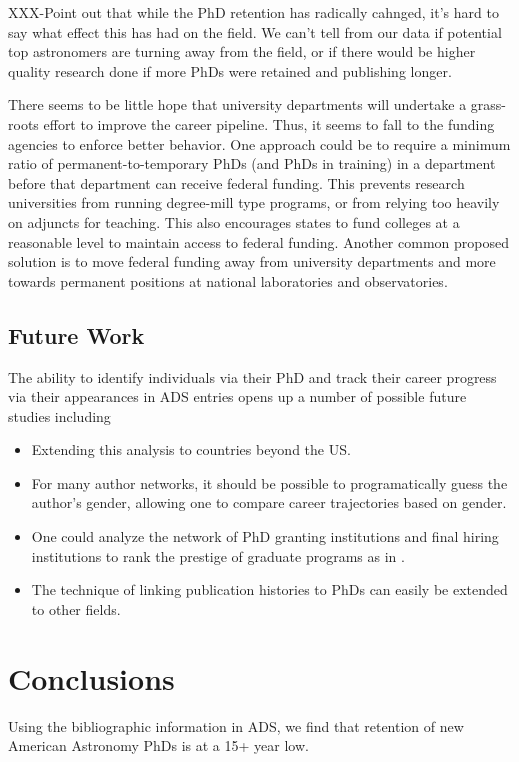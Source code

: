 \documentclass[preprint2]{aastex}
\begin{document}
XXX-Point out that while the PhD retention has radically cahnged, it's hard to say what effect this has had on the field. We can't tell from our data if potential top astronomers are turning away from the field, or if there would be higher quality research done if more PhDs were retained and publishing longer.

There seems to be little hope that university departments will undertake a grass-roots effort to improve the career pipeline. Thus, it seems to fall to the funding agencies to enforce better behavior.  One approach could be to require a minimum ratio of permanent-to-temporary PhDs (and PhDs in training) in a department before that department can receive federal funding.  This prevents research universities from running degree-mill type programs, or from relying too heavily on adjuncts for teaching.  This also encourages states to fund colleges at a reasonable level to maintain access to federal funding.  Another common proposed solution is to move federal funding away from university departments and more towards permanent positions at national laboratories and observatories.


\subsection{Future Work}

The ability to identify individuals via their PhD and track their career progress via their appearances in ADS entries opens up a number of possible future studies including
\begin{itemize}
\item{Extending this analysis to countries beyond the US.}
\item{For many author networks, it should be possible to programatically guess the author's gender, allowing one to compare career trajectories based on gender.}
\item{One could analyze the network of PhD granting institutions and final hiring institutions to rank the prestige of graduate programs as in \citet{Clausete15}.}
\item{The technique of linking publication histories to PhDs can easily be extended to other fields.}
\end{itemize}

\section{Conclusions}
Using the bibliographic information in ADS, we find that retention of new American Astronomy PhDs is at a 15+ year low.  
\end{document}
